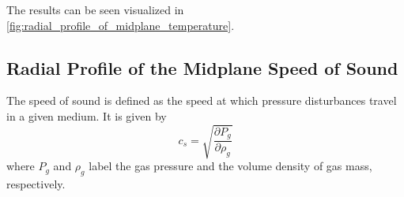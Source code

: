 


    The results can be seen visualized in \cref{fig:radial_profile_of_midplane_temperature}.

    


    \clearpage\subsection{Radial Profile of the Midplane Speed of Sound}

        The speed of sound is defined as the speed at which pressure disturbances travel in a 
        given medium. It is given by 
        \begin{equation}
            \label{eq:general_definition_of_sound_speed}
            c_s = \sqrt{\frac{\partial P_g}{\partial \rho_g}}
        \end{equation}
        where $P_g$ and $\rho_g$ label the gas pressure and the volume density of gas mass, respectively. 
        
